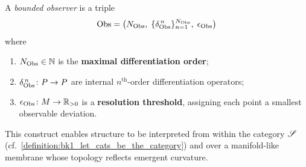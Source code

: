 \begin{definition}
\label{definition:bk1_bounded_observer}
A \emph{bounded observer} is a triple
\[
\mathrm{Obs} = \bigl(N_{\mathrm{Obs}},\;\{\delta_{\mathrm{Obs}}^{\,n}\}_{n=1}^{N_{\mathrm{Obs}}},\;\epsilon_{\mathrm{Obs}}\bigr)
\]
where
\begin{enumerate}[label=(\roman*)]
  \item \(N_{\mathrm{Obs}} \in \mathbb{N}\) is the \textbf{maximal differentiation order};
  \item \(\delta_{\mathrm{Obs}}^{\,n}\colon P \to P\) are internal \(n^{\text{th}}\)-order differentiation operators;
  \item \(\epsilon_{\mathrm{Obs}}\colon M \to \mathbb{R}_{>0}\) is a \textbf{resolution threshold}, assigning each point a smallest observable deviation.
\end{enumerate}
This construct enables structure to be interpreted from within the category \(\mathscr{S}\) (cf.~\ref{definition:bk1_let_cats_be_the_category}) and over a manifold-like membrane whose topology reflects emergent curvature.
\end{definition}

